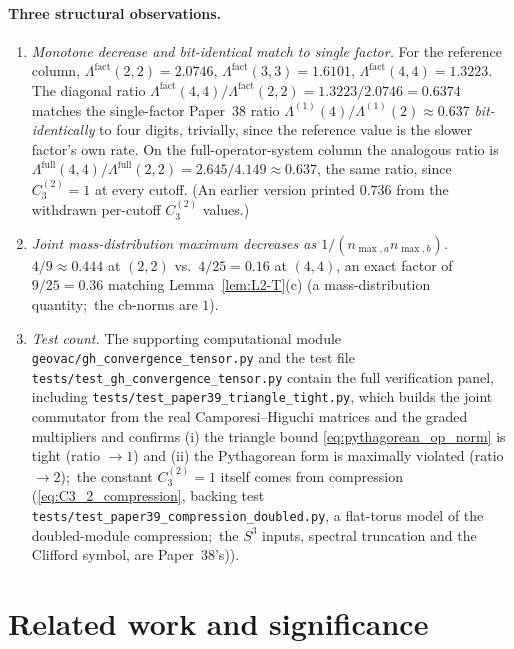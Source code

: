 \documentclass[11pt,a4paper]{article}
\theoremstyle{plain}
\theoremstyle{definition}
\newcommand{\nmaxa}{n_{\max,a}}
\newcommand{\nmaxb}{n_{\max,b}}
\newcommand{\sthree}{S^{3}}
\begin{document}
\paragraph{Three structural observations.}
\begin{enumerate}
\item \emph{Monotone decrease and bit-identical match to single
factor.} For the reference column,
$\Lambda^{\mathrm{fact}}(2,2) = 2.0746$,
$\Lambda^{\mathrm{fact}}(3,3) = 1.6101$,
$\Lambda^{\mathrm{fact}}(4,4) = 1.3223$. The diagonal ratio
$\Lambda^{\mathrm{fact}}(4,4) / \Lambda^{\mathrm{fact}}(2,2) =
1.3223/2.0746 = 0.6374$ matches the single-factor Paper~38 ratio
$\Lambda^{(1)}(4)/\Lambda^{(1)}(2) \approx 0.637$
\emph{bit-identically} to four digits, trivially, since the reference
value is the slower factor's own rate. On the full-operator-system column
the analogous ratio is
$\Lambda^{\mathrm{full}}(4,4)/\Lambda^{\mathrm{full}}(2,2) =
2.645/4.149 \approx 0.637$, the same ratio, since $C_3^{(2)} = 1$ at every
cutoff. (An earlier version printed $0.736$ from the withdrawn per-cutoff
$C_3^{(2)}$ values.)

\item \emph{Joint mass-distribution maximum decreases as
$1/(\nmaxa \nmaxb)$.}  $4/9 \approx 0.444$ at $(2,2)$ vs.\
$4/25 = 0.16$ at $(4,4)$, an exact factor of $9/25 = 0.36$ matching
Lemma~\ref{lem:L2-T}(c) (a mass-distribution quantity;\ the cb-norms
are $1$).

\item \emph{Test count.} The supporting computational module
\texttt{geovac/gh\_convergence\_tensor.py} and
the test file \texttt{tests/test\_gh\_convergence\_tensor.py} contain
the full verification panel, including
\texttt{tests/test\_paper39\_triangle\_tight.py}, which builds the
joint commutator from the real Camporesi--Higuchi matrices and the
graded multipliers and confirms (i) the triangle bound
\eqref{eq:pythagorean_op_norm} is tight (ratio $\to 1$) and (ii) the
Pythagorean form is maximally violated (ratio $\to 2$);\ the constant
$C_3^{(2)} = 1$ itself comes from compression
(\eqref{eq:C3_2_compression}, backing test
\texttt{tests/test\_paper39\_compression\_doubled.py}, a flat-torus model of
the doubled-module compression;\ the $\sthree$ inputs, spectral truncation
and the Clifford symbol, are Paper~38's)).
\end{enumerate}

\section{Related work and significance}\label{sec:related_work}
\end{document}
